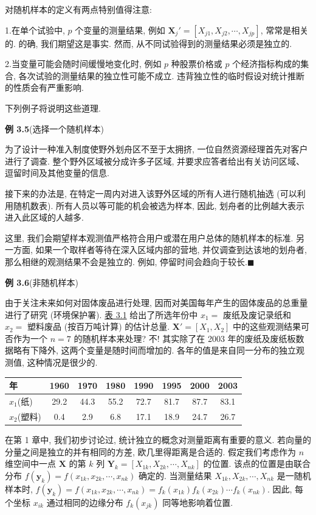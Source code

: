 对随机样本的定义有两点特别值得注意:

1.\quad 在单个试验中, $p$ 个变量的测量结果, 例如 $\mathbf{X}_{j}'=[X_{j1},X_{j2},\cdots,X_{jp}]$, 常常是相关的. 的确, 我们期望这是事实. 然而, 从不同试验得到的测量结果必须是独立的.

2.\quad 当变量可能会随时间缓慢地变化时, 例如 $p$ 种股票价格或 $p$ 个经济指标构成的集合, 各次试验的测量结果的独立性可能不成立. 违背独立性的临时假设对统计推断的性质会有严重影响.

下列例子将说明这些道理.

\medskip
\noindent\textbf{例 3.5}\quad (选择一个随机样本)

为了设计一种准入制度使野外划舟区不至于太拥挤, 一位自然资源经理首先对客户进行了调查. 整个野外区域被分成许多子区域, 并要求应答者给出有关访问区域、逗留时间及其他变量的信息.

接下来的办法是, 在特定一周内对进入该野外区域的所有人进行随机抽选 (可以利用随机数表). 所有人员以等可能的机会被选为样本, 因此, 划舟者的比例越大表示进入此区域的人越多.

这里, 我们会期望样本观测值严格符合用户或潜在用户总体的随机样本的标准. 另一方面, 如果一个取样者等待在深入区域内部的营地, 并仅调查到达该地的划舟者, 那么相继的观测结果不会是独立的. 例如, 停留时间会趋向于较长.\hfill$\blacksquare$

\medskip
\noindent\textbf{例 3.6}\quad (非随机样本)

由于关注未来如何对固体废品进行处理, 因而对美国每年产生的固体废品的总重量进行了研究 (环境保护署). \hyperref[tab:3.1]{表 3.1} 给出了所选年份中 $x_{1}=$ 废纸及废记录纸和 $x_{2}=$ 塑料废品 (按百万吨计算) 的估计总量. $\mathbf{X}'=[X_{1},X_{2}]$ 中的这些观测结果可否作为一个 $n=7$ 的随机样本来处理? 不! 其实除了在 2003 年的废纸及废纸板数据略有下降外, 这两个变量是随时间而增加的. 各年的值是来自同一分布的独立观测值, 这种情况是很少的.

\begin{mvtable}
\label{tab:3.1}
\centering
\begin{tabular}{lccccccc}
\toprule
年 & 1960 & 1970 & 1980 & 1990 & 1995 & 2000 & 2003\\
\midrule
$x_{1}$(纸) & 29.2 & 44.3 & 55.2 & 72.7 & 81.7 & 87.7 & 83.1\\
$x_{2}$(塑料) & 0.4 & 2.9 & 6.8 & 17.1 & 18.9 & 24.7 & 26.7\\
\bottomrule
\end{tabular}
\end{mvtable}

在第 1 章中, 我们初步讨论过, 统计独立的概念对测量距离有重要的意义. 若向量的分量之间是独立的并有相同的方差, 欧几里得距离是合适的. 假定我们考虑作为 $n$ 维空间中一点 $\mathbf{X}$ 的第 $k$ 列 $\mathbf{Y}_{k}=[X_{1k},X_{2k},\cdots,X_{nk}]$ 的位置. 该点的位置是由联合分布 $f(\mathbf{y}_{k})=f(x_{1k},x_{2k},\cdots,x_{nk})$ 确定的. 当测量结果 $X_{1k},X_{2k},\cdots,X_{nk}$ 是一随机样本时, $f(\mathbf{y}_{k})=f(x_{1k},x_{2k},\cdots,x_{nk})=f_{k}(x_{1k})f_{k}(x_{2k})\cdots f_{k}(x_{nk})$. 因此, 每个坐标 $x_{ik}$ 通过相同的边缘分布 $f_{k}(x_{jk})$ 同等地影响着位置.

